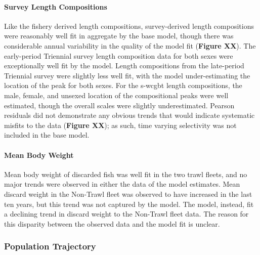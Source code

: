 \documentclass[11pt,
  english,
  letterpaper,
]{article}
\begin{document}
\hypertarget{survey-length-compositions}{%
\paragraph{Survey Length Compositions}\label{survey-length-compositions}}

Like the fishery derived length compositions, survey-derived length compositions were reasonably well fit in aggregate by the base model, though there was considerable annual variability in the quality of the model fit (\textbf{Figure XX}). The early-period Triennial survey length composition data for both sexes were exceptionally well fit by the model. Length compositions from the late-period Triennial survey were slightly less well fit, with the model under-estimating the location of the peak for both sexes. For the \gls{s-wcgbt} length compositions, the male, female, and unsexed location of the compositional peaks were well estimated, though the overall scales were slightly underestimated. Pearson residuals did not demonstrate any obvious trends that would indicate systematic misfits to the data (\textbf{Figure XX}); as such, time varying selectivity was not included in the base model.

\hypertarget{mean-body-weight}{%
\paragraph{Mean Body Weight}\label{mean-body-weight}}

Mean body weight of discarded fish was well fit in the two trawl fleets, and no major trends were observed in either the data of the model estimates. Mean discard weight in the Non-Trawl fleet was observed to have increased in the last ten years, but this trend was not captured by the model. The model, instead, fit a declining trend in discard weight to the Non-Trawl fleet data. The reason for this disparity between the observed data and the model fit is unclear.

\hypertarget{population-trajectory}{%
\subsubsection{Population Trajectory}\label{population-trajectory}}
\end{document}
